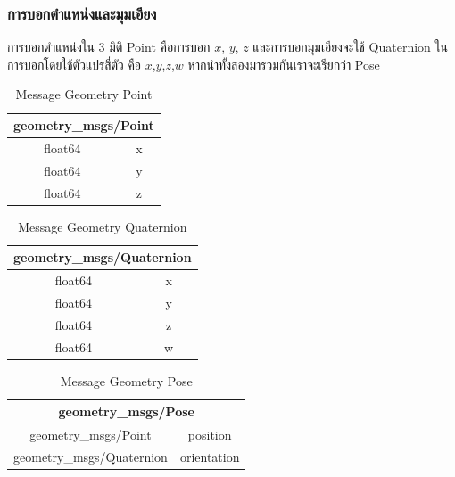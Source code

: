 \subsubsection*{การบอกตำแหน่งและมุมเอียง}
การบอกตำแหน่งใน 3 มิติ Point คือการบอก $x$, $y$, $z$ และการบอกมุมเอียงจะใช้ Quaternion
ในการบอกโดยใช้ตัวแปรสี่ตัว คือ $x$,$y$,$z$,$w$ หากนำทั้งสองมารวมกันเราจะเรียกว่า Pose
\begin{table}[!ht]
	\centering
	\begin{tabular}{| c | c |}
		\hline
		\multicolumn{2}{|c|}{geometry\_msgs/Point}\\
		\hline
		float64 & x \\
		float64 & y \\
		float64 & z \\
		\hline
	\end{tabular}
	\caption{Message Geometry Point}
	\label{tab:geometry_point}
\end{table}
\begin{table}[!ht]
	\centering
	\begin{tabular}{| c | c |}
		\hline
		\multicolumn{2}{|c|}{geometry\_msgs/Quaternion}\\
		\hline
		float64 & x \\
		float64 & y \\
		float64 & z \\
		float64 & w \\
		\hline
	\end{tabular}
	\caption{Message Geometry Quaternion}
	\label{tab:geometry_quaternion}
\end{table}
\begin{table}[!ht]
	\centering
	\begin{tabular}{| c | c |}
		\hline
		\multicolumn{2}{|c|}{geometry\_msgs/Pose}\\
		\hline
		geometry\_msgs/Point & position \\
		geometry\_msgs/Quaternion & orientation \\
		\hline
	\end{tabular}
	\caption{Message Geometry Pose}
	\label{tab:geometry_pose}
\end{table}

